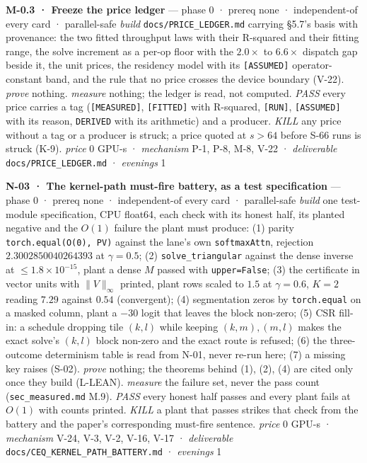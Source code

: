 \documentclass[11pt,a4paper]{article}
\newcounter{none}                 %
\theoremstyle{plain}
\theoremstyle{definition}
\theoremstyle{remark}
\begin{document}
\textbf{M-0.3 · Freeze the price ledger} --- phase 0 · prereq none ·
independent-of every card · parallel-safe \emph{build}
\texttt{docs/PRICE\_LEDGER.md} carrying §5.7's basis with provenance:
the two fitted throughput laws with their R-squared and their fitting
range, the solve increment as a per-op floor with the \(2.0\times\) to
\(6.6\times\) dispatch gap beside it, the unit prices, the residency
model with its \texttt{{[}ASSUMED{]}} operator-constant band, and the
rule that no price crosses the device boundary (V-22). \emph{prove}
nothing. \emph{measure} nothing; the ledger is read, not computed.
\emph{PASS} every price carries a tag (\texttt{{[}MEASURED{]}},
\texttt{{[}FITTED{]}} with R-squared, \texttt{{[}RUN{]}},
\texttt{{[}ASSUMED{]}} with its reason, \texttt{DERIVED} with its
arithmetic) and a producer. \emph{KILL} any price without a tag or a
producer is struck; a price quoted at \(s>64\) before S-66 runs is
struck (K-9). \emph{price} \(0\) GPU-s · \emph{mechanism} P-1, P-8, M-8,
V-22 · \emph{deliverable} \texttt{docs/PRICE\_LEDGER.md} ·
\emph{evenings} 1

\textbf{N-03 · The kernel-path must-fire battery, as a test
specification} --- phase 0 · prereq none · independent-of every card ·
parallel-safe \emph{build} one test-module specification, CPU float64,
each check with its honest half, its planted negative and the \(O(1)\)
failure the plant must produce: (1) parity
\texttt{torch.equal(O(0),\ PV)} against the lane's own
\texttt{softmaxAttn}, rejection \(2.3002850040264393\) at
\(\gamma=0.5\); (2) \texttt{solve\_triangular} against the dense inverse
at \(\le1.8\times10^{-15}\), plant a dense \(M\) passed with
\texttt{upper=False}; (3) the certificate in vector units with
\(\|V\|_\infty\) printed, plant rows scaled to \(1.5\) at
\(\gamma=0.6\), \(K=2\) reading \(7.29\) against \(0.54\) (convergent);
(4) segmentation zeros by \texttt{torch.equal} on a masked column, plant
a \(-30\) logit that leaves the block non-zero; (5) CSR fill-in: a
schedule dropping tile \((k,l)\) while keeping \((k,m),(m,l)\) makes the
exact solve's \((k,l)\) block non-zero and the exact route is refused;
(6) the three-outcome determinism table is read from N-01, never re-run
here; (7) a missing key raises (S-02). \emph{prove} nothing; the
theorems behind (1), (2), (4) are cited only once they build (L-LEAN).
\emph{measure} the failure set, never the pass count
(\texttt{sec\_measured.md} M.9). \emph{PASS} every honest half passes
and every plant fails at \(O(1)\) with counts printed. \emph{KILL} a
plant that passes strikes that check from the battery and the paper's
corresponding must-fire sentence. \emph{price} \(0\) GPU-s ·
\emph{mechanism} V-24, V-3, V-2, V-16, V-17 · \emph{deliverable}
\texttt{docs/CEQ\_KERNEL\_PATH\_BATTERY.md} · \emph{evenings} 1
\end{document}
